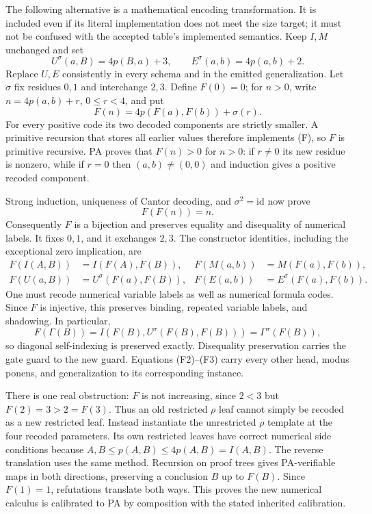 The following alternative is a mathematical encoding transformation.  It is
included even if its literal implementation does not meet the size target;
it must not be confused with the accepted table's implemented semantics.
Keep $I,M$ unchanged and set
\[
 U^{\sigma}(a,B)=4p(B,a)+3,\qquad E^{\sigma}(a,b)=4p(a,b)+2.
\]
Replace $U,E$ consistently in every schema and in the emitted
generalization.  Let $\sigma$ fix residues $0,1$ and interchange $2,3$.
Define $F(0)=0$; for $n>0$, write $n=4p(a,b)+r$, $0\leq r<4$, and put
\[
 F(n)=4p(F(a),F(b))+\sigma(r).                         \tag{F}
\]
For every positive code its two decoded components are strictly smaller.
A primitive recursion that stores all earlier values therefore implements
(F), so $F$ is primitive recursive.  PA proves that $F(n)>0$ for $n>0$:
if $r\ne0$ its new residue is nonzero, while if $r=0$ then $(a,b)\ne(0,0)$
and induction gives a positive recoded component.

Strong induction, uniqueness of Cantor decoding, and
$\sigma^2=\mathrm{id}$ now prove
\[
 F(F(n))=n.                                             \tag{F1}
\]
Consequently $F$ is a bijection and preserves equality and disequality of
numerical labels.  It fixes $0,1$, and it exchanges $2,3$.  The constructor
identities, including the exceptional zero implication, are
\begin{align*}
 F(I(A,B))&=I(F(A),F(B)),&F(M(a,b))&=M(F(a),F(b)),\\
 F(U(a,B))&=U^{\sigma}(F(a),F(B)),&
 F(E(a,b))&=E^{\sigma}(F(a),F(b)).                       \tag{F2}
\end{align*}
One must recode numerical variable labels as well as numerical formula
codes.  Since $F$ is injective, this preserves binding, repeated variable
labels, and shadowing.  In particular,
\[
 F(\Gamma(B))=I(F(B),U^{\sigma}(F(B),F(B)))
             =\Gamma^{\sigma}(F(B)),                  \tag{F3}
\]
so diagonal self-indexing is preserved exactly.  Disequality preservation
carries the gate guard to the new guard.  Equations (F2)--(F3) carry every
other head, modus ponens, and generalization to its corresponding instance.

There is one real obstruction: $F$ is not increasing, since $2<3$ but
$F(2)=3>2=F(3)$.  Thus an old restricted $\rho$ leaf cannot simply be
recoded as a new restricted leaf.  Instead instantiate the unrestricted
$\rho$ template at the four recoded parameters.  Its own restricted leaves
have correct numerical side conditions because
$A,B\leq p(A,B)\leq4p(A,B)=I(A,B)$.  The reverse translation uses the same
method.  Recursion on proof trees gives PA-verifiable maps in both directions,
preserving a conclusion $B$ up to $F(B)$.  Since $F(1)=1$, refutations
translate both ways.  This proves the new numerical calculus is calibrated
to PA by composition with the stated inherited calibration.

